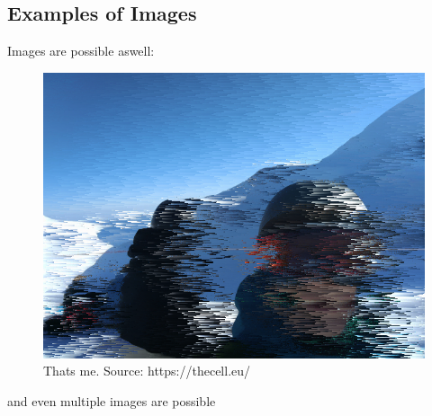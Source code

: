 \documentclass[10pt]{article}
\begin{document}
\subsection{Examples of Images}
Images are possible aswell:
\begin{figure}[H]
	\includegraphics[width=\textwidth, height=\textheight, keepaspectratio]{example1.png}
	\caption{Thats me. Source: {https://thecell.eu/}}
\end{figure}

and even multiple images are possible
\end{document}
